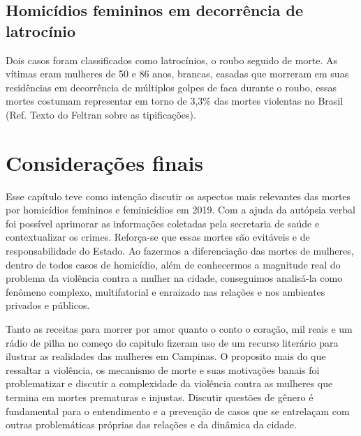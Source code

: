 \subsection{Homicídios femininos em decorrência de latrocínio}

Dois casos foram classificados como latrocínios, o roubo seguido de morte. As vítimas eram mulheres de 50 e 86 anos, brancas, casadas que morreram em suas residências em decorrência de múltiplos golpes de faca durante o roubo, essas mortes costumam representar em torno de 3,3\% das mortes violentas no Brasil  (Ref. Texto do Feltran sobre as tipificações).

\section{Considerações finais}

Esse capítulo teve como intenção discutir os aspectos mais relevantes das mortes por homicídios femininos e feminicídios em 2019. Com a ajuda da autópsia verbal foi possível aprimorar as informações coletadas pela secretaria de saúde e contextualizar os crimes. Reforça-se que essas mortes são evitáveis e de responsabilidade do Estado. Ao fazermos a diferenciação das mortes de mulheres, dentro de todos casos de  homicídio, além de conhecermos a magnitude real do problema da violência contra a mulher na cidade, conseguimos analisá-la como fenômeno complexo, multifatorial e enraizado nas relações e nos ambientes privados e públicos. 

Tanto as receitas para morrer por amor quanto o conto o coração, mil reais e um rádio de pilha no começo do capitulo fizeram uso de um recurso literário para ilustrar as realidades das mulheres em Campinas. O proposito mais do que ressaltar a violência, os mecanismo de morte e suas motivações banais foi problematizar e discutir a complexidade da violência contra as mulheres que termina em mortes prematuras e injustas. Discutir questões de gênero é fundamental para o  entendimento e a prevenção de casos que se entrelaçam com outras problemáticas próprias das relações e da dinâmica da cidade. 
